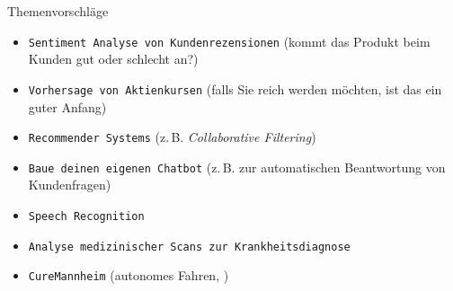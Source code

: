 \begin{dwHeaderFrame}{Themenvorschläge}
	\begin{itemize} 
		\item \texttt{Sentiment Analyse von Kundenrezensionen} (kommt das Produkt beim Kunden gut oder schlecht an?)
		\item \texttt{Vorhersage von Aktienkursen} (falls Sie reich werden möchten, ist das ein guter Anfang)
		\item \texttt{Recommender Systems} (z.\,B. \textit{Collaborative Filtering})
		\item \texttt{Baue deinen eigenen Chatbot} (z.\,B. zur automatischen Beantwortung von Kundenfragen)
		\item \texttt{Speech Recognition}
		\item \texttt{Analyse medizinischer Scans zur Krankheitsdiagnose}
		\item \texttt{CureMannheim} (autonomes Fahren, \curemannheim)
	\end{itemize}
\end{dwHeaderFrame}


\makethanks

